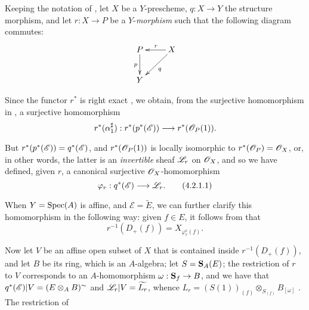 \begin{env}[4.2.1]
\label{II.4.2.1}
Keeping the notation of , let $X$ be a $Y$-prescheme, $q:X\to Y$ the structure morphism, and let $r:X\to P$ be a $Y$-\emph{morphism} such that the following diagram commutes:
\[
  \xymatrix{
    P \ar[d]_p & X \ar[l]_r \ar[dl]^q
  \\Y
  }
\]

Since the functor $r^*$ is right exact , we obtain, from the surjective homomorphism in , a surjective homomorphism
\[
  r^*(\alpha_1^\sharp): r^*(p^*(\sh{E})) \to r^*(\sh{O}_P(1)).
\]

But $r^*(p^*(\mathscr{E}))=q^*(\mathscr{E})$, and $r^*(\mathscr{O}_P(1))$ is locally isomorphic to $r^*(\mathscr{O}_P)=\mathscr{O}_X$, or, in other words, the latter is an \emph{invertible} sheaf $\mathscr{L}_r$ on $\mathscr{O}_X$, and so we have defined, given $r$, a canonical surjective $\mathscr{O}_X$-homomorphism
\[
\label{II.4.2.1.1}
  \varphi_r:q^*(\sh{E}) \to \sh{L}_r.
  \tag{4.2.1.1}
\]

When $Y=\operatorname{Spec}(A)$ is affine, and $\mathscr{E}=\widetilde{E}$, we can further clarify this homomorphism in the following way:
given $f\in E$, it follows from  that
\[
\label{II.4.2.1.2}
  r^{-1}(D_+(f)) = X_{\varphi_r^\flat(f)}.
  \tag{4.2.1.2}
\]

Now let $V$ be an affine open subset of $X$ that is contained inside $r^{-1}(D_+(f))$, and let $B$ be its ring, which is an $A$-algebra;
let $S=\mathbf{S}_A(E)$;
the restriction of $r$ to $V$ corresponds to an $A$-homomorphism $\omega:\bb{S}_f\to B$, and we have that $q^*(\mathscr{E})|V = (E\otimes_A B)^\sim$ and $\mathscr{L}_r|V = \widetilde{L_r}$, whence $L_r = (S(1))_{(f)}\otimes_{S_{(f)}}B_{[\omega]}$ .
The restriction of
\end{env}








